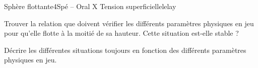 
\begin{exercise}{Sphère flottante}{4}{Spé -- Oral X}
{Tension superficielle}{lelay}

\begin{questions}
    \question Trouver la relation que doivent vérifier les différents paramètres physiques en jeu pour qu'elle flotte à la moitié de sa hauteur. Cette situation est-elle stable ?

    \question Décrire les différentes situations toujours en fonction des différents paramètres physiques en jeu.
\end{questions}
\end{exercise}